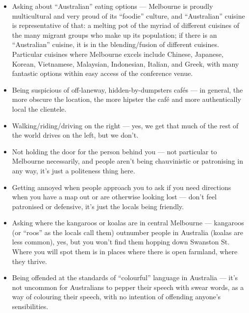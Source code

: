 \begin{itemize}
\item Asking about ``Australian'' eating options --- Melbourne is
  proudly multicultural and very proud of its ``foodie'' culture, and
  ``Australian'' cuisine is representative of that: a melting pot of the
  myriad of different cuisines of the many migrant groups who make up
  its population; if there is an ``Australian'' cuisine, it is in the
  blending/fusion of different cuisines. Particular cuisines where
  Melbourne excels include Chinese, Japanese, Korean, Vietnamese,
  Malaysian, Indonesian, Italian, and Greek, with many fantastic options
  within easy access of the conference venue.
\item Being suspicious of off-laneway, hidden-by-dumpsters caf\'es ---
  in general, the more obscure the location, the more hipster the caf\'e
  and more authentically local the clientele.
\item Walking/riding/driving on the right --- yes, we get that much of
  the rest of the world drives on the left, but we don't.
\item Not holding the door for the person behind you --- not particular
  to Melbourne necessarily, and people aren't being chauvinistic or
  patronising in any way, it's just a politeness thing here.
\item Getting annoyed when people approach you to ask if you need
  directions when you have a map out or are otherwise looking lost ---
  don't feel patronised or defensive, it's just the locals being
  friendly.
\item Asking where the kangaroos or koalas are in central Melbourne ---
  kangaroos (or ``roos'' as the locals call them) outnumber people in
  Australia (koalas are less common), yes, but you won't find them
  hopping down Swanston St. Where you will spot them is in places where
  there is open farmland, where they thrive.
\item Being offended at the standards of ``colourful'' language in
  Australia --- it's not uncommon for Australians to pepper their speech
  with swear words, as a way of colouring their speech, with no
  intention of offending anyone's sensibilities.
\end{itemize}


